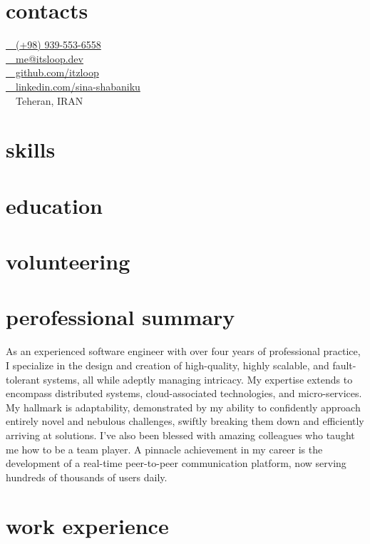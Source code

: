 \documentclass[a4paper,20pt]{article}
\begin{document}
\begin{minipage}[t]{0.3\textwidth}
  \section{contacts}
  {
    \href{tel:989395536558}{ ~~(+98) 939-553-6558} \\ \vspace{6pt}  
    \href{mailto:me@itsloop.dev}{ ~~me@itsloop.dev} \\ \vspace{6pt} 
    \href{https://github.com/itzloop}{ ~~github.com/itzloop}\\ \vspace{6pt} 
    \href{https://linkedin.com/in/sina-shabaniku}{ ~~linkedin.com/sina-shabaniku} \\ \vspace{6pt} 
     ~~Teheran, IRAN
    \vspace*{14pt}
  }


  \section{skills}
  \section{education}
  \section{volunteering}
\end{minipage} %
\hspace{20pt}
\begin{minipage}[t]{0.65\textwidth}
  \section{perofessional summary}
    \begin{justify}
      As an experienced software engineer with over four years of professional practice, I specialize in the design and creation of high-quality, highly scalable, and fault-tolerant systems, all while adeptly managing intricacy. My expertise extends to encompass distributed systems, cloud-associated technologies, and micro-services. My hallmark is adaptability, demonstrated by my ability to confidently approach entirely novel and nebulous challenges, swiftly breaking them down and efficiently arriving at solutions. I've also been blessed with amazing colleagues who taught me how to be a team player. A pinnacle achievement in my career is the development of a real-time peer-to-peer communication platform, now serving hundreds of thousands of users daily.
    \end{justify}
  \section{work experience}
\end{minipage}
\end{document}
